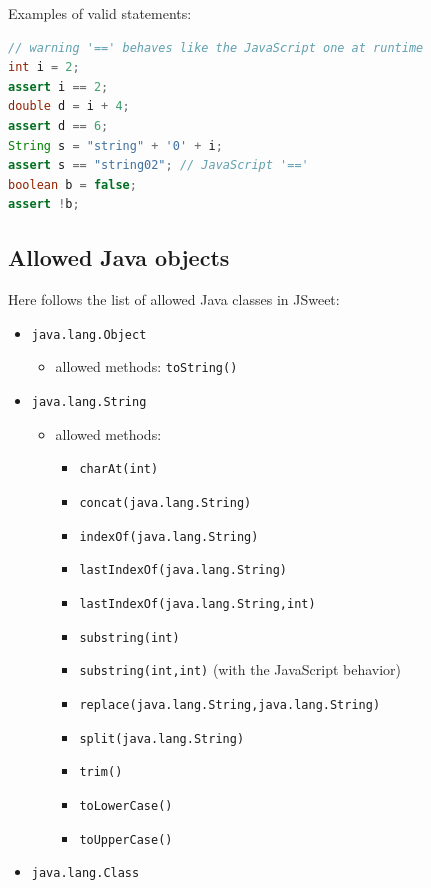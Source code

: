 \documentclass[a4paper]{report}
\begin{document}
\noindent
Examples of valid statements:

\begin{lstlisting}[language=Java]
// warning '==' behaves like the JavaScript one at runtime
int i = 2;
assert i == 2;
double d = i + 4;
assert d == 6;
String s = "string" + '0' + i;
assert s == "string02"; // JavaScript '=='
boolean b = false;
assert !b;
\end{lstlisting}

\subsection{Allowed Java objects}

Here follows the list of allowed Java classes in JSweet:

\begin{itemize}
\item \texttt{java.lang.Object}
	\begin{itemize}
	\item allowed methods: \texttt{toString()}
	\end{itemize}
\item \texttt{java.lang.String}
	\begin{itemize}
	\item allowed methods: 
			\begin{itemize}
				\item \texttt{charAt(int)}
				\item \texttt{concat(java.lang.String)} 
				\item \texttt{indexOf(java.lang.String)}
				\item \texttt{lastIndexOf(java.lang.String)}
				\item \texttt{lastIndexOf(java.lang.String,int)}
				\item \texttt{substring(int)}
				\item \texttt{substring(int,int)} (with the JavaScript behavior)
				\item \texttt{replace(java.lang.String,java.lang.String)}
				\item \texttt{split(java.lang.String)}
				\item \texttt{trim()}
				\item \texttt{toLowerCase()}
				\item \texttt{toUpperCase()}
			\end{itemize}
	\end{itemize}
\item \texttt{java.lang.Class}
	\begin{itemize}

\end{itemize}
\end{itemize}
\end{document}
